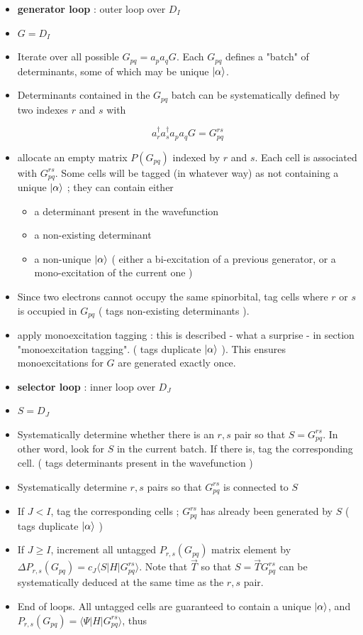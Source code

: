 \documentclass[./thesis.tex]{subfiles}
\begin{document}
\begin{itemize}
\item
\textbf{generator loop} : outer loop over $D_I$
\item
$G = D_I$
\item
Iterate over all possible $G_{pq} = a_p a_q G$. Each $G_{pq}$ defines a "batch" of determinants, some of which may be unique $\ket \alpha$.
\item
Determinants contained in the $G_{pq}$ batch can be systematically defined by two indexes $r$ and $s$ with

\begin{equation}
a^\dagger_r a^\dagger_s a_p a_q  G = G^{rs}_{pq}
\end{equation}

\item
allocate an empty matrix $P(G_{pq})$ indexed by $r$ and $s$. Each cell is associated with $G^{rs}_{pq}$. Some cells will be tagged (in whatever way) as not containing a unique $\ket \alpha$ ; they can contain either
\begin{itemize}
\item
a determinant present in the wavefunction
\item
a non-existing determinant
\item
a non-unique $\ket \alpha$ ( either a bi-excitation of a previous generator, or a mono-excitation of the current one )
\end{itemize}

\item
Since two electrons cannot occupy the same spinorbital, tag cells where $r$ or $s$ is occupied in $G_{pq}$ ( tags non-existing determinants ). 
\item
apply monoexcitation tagging : this is described - what a surprise - in section "monoexcitation tagging". ( tags duplicate $\ket \alpha$ ). This ensures monoexcitations for $G$ are generated exactly once.
\item
\textbf{selector loop} : inner loop over $D_J$ 
\item
$S = D_J$
\item
Systematically determine whether there is an $r,s$ pair so that $S=G_{pq}^{rs}$. In other word, look for $S$ in the current batch. If there is, tag the corresponding cell. ( tags determinants present in the wavefunction )
\item
Systematically determine $r,s$ pairs so that $G_{pq}^{rs}$ is connected to $S$
\item
If $J<I$, tag the corresponding cells ; $G_{pq}^{rs}$ has already been generated by $S$ ( tags duplicate $\ket \alpha$ )
\item
If $J \geq I$, increment all untagged $P_{r,s}(G_{pq})$ matrix element by $\Delta P_{r,s}(G_{pq}) = c_J\langle S| H|  G^{rs}_{pq} \rangle$. Note that $\overrightarrow{T}$ so that $S=\overrightarrow{T}G^{rs}_{pq}$ can be systematically deduced at the same time as the $r,s$ pair.
\item
End of loops. All untagged cells are guaranteed to contain a unique $\ket \alpha$, and $P_{r,s}(G_{pq}) = \langle \Psi |H|G^{rs}_{pq} \rangle$, thus\\


\end{itemize}
\end{document}
